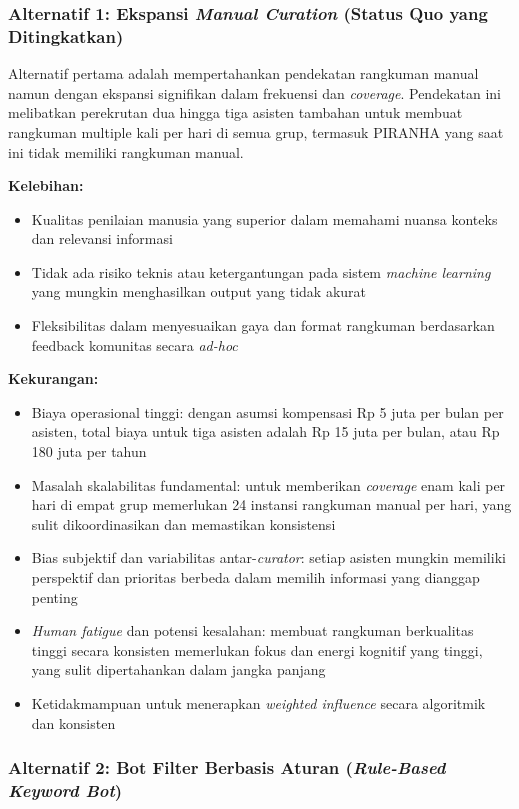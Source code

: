 \subsubsection{Alternatif 1: Ekspansi \textit{Manual Curation} (Status Quo yang Ditingkatkan)}

Alternatif pertama adalah mempertahankan pendekatan rangkuman manual namun dengan ekspansi signifikan dalam frekuensi dan \textit{coverage}. Pendekatan ini melibatkan perekrutan dua hingga tiga asisten tambahan untuk membuat rangkuman multiple kali per hari di semua grup, termasuk PIRANHA yang saat ini tidak memiliki rangkuman manual.

\textbf{Kelebihan:}
\begin{itemize}
\item Kualitas penilaian manusia yang superior dalam memahami nuansa konteks dan relevansi informasi
\item Tidak ada risiko teknis atau ketergantungan pada sistem \textit{machine learning} yang mungkin menghasilkan output yang tidak akurat
\item Fleksibilitas dalam menyesuaikan gaya dan format rangkuman berdasarkan feedback komunitas secara \textit{ad-hoc}
\end{itemize}

\textbf{Kekurangan:}
\begin{itemize}
\item Biaya operasional tinggi: dengan asumsi kompensasi Rp 5 juta per bulan per asisten, total biaya untuk tiga asisten adalah Rp 15 juta per bulan, atau Rp 180 juta per tahun
\item Masalah skalabilitas fundamental: untuk memberikan \textit{coverage} enam kali per hari di empat grup memerlukan 24 instansi rangkuman manual per hari, yang sulit dikoordinasikan dan memastikan konsistensi
\item Bias subjektif dan variabilitas antar-\textit{curator}: setiap asisten mungkin memiliki perspektif dan prioritas berbeda dalam memilih informasi yang dianggap penting
\item \textit{Human fatigue} dan potensi kesalahan: membuat rangkuman berkualitas tinggi secara konsisten memerlukan fokus dan energi kognitif yang tinggi, yang sulit dipertahankan dalam jangka panjang
\item Ketidakmampuan untuk menerapkan \textit{weighted influence} secara algoritmik dan konsisten
\end{itemize}

\subsubsection{Alternatif 2: Bot Filter Berbasis Aturan (\textit{Rule-Based Keyword Bot})}

